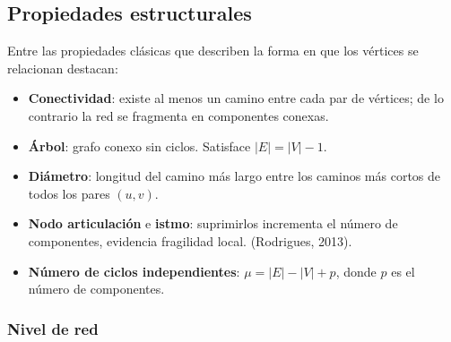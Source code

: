 \documentclass[11pt]{article}
\begin{document}
		\subsection{Propiedades estructurales}

		Entre las propiedades clásicas que describen la forma en que los vértices se relacionan destacan:
		\begin{itemize}
			\item \textbf{Conectividad}: existe al menos un camino entre cada par de vértices; de lo contrario la red se fragmenta en componentes conexas.
			\item \textbf{Árbol}: grafo conexo sin ciclos. Satisface $|E|=|V|-1$.
			\item \textbf{Diámetro}: longitud del camino más largo entre los caminos más cortos de todos los pares $(u,v)$.
			\item \textbf{Nodo articulación} e \textbf{istmo}: suprimirlos incrementa el número de componentes, evidencia fragilidad local. (Rodrigues, 2013).
			\item \textbf{Número de ciclos independientes}: $\mu = |E|-|V|+p$, donde $p$ es el número de componentes.
		\end{itemize}

		\subsubsection*{Nivel de red}
\end{document}
